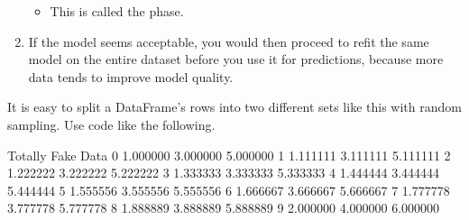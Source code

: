 \documentclass[letterpaper,10pt,english]{sphinxmanual}
\begin{document}
\begin{enumerate}
\begin{itemize}
\item {} 
This is called the  phase.

\end{itemize}

\item {} 
If the model seems acceptable, you would then proceed to re\sphinxhyphen{}fit the same model on the entire dataset  before you use it for predictions, because more data tends to improve model quality.

\end{enumerate}

It is easy to split a DataFrame’s rows into two different sets like this with random sampling.  Use code like the following.

\begin{sphinxVerbatim}[commandchars=\\\{\}]
   
   
           
\end{sphinxVerbatim}

\begin{sphinxVerbatim}[commandchars=\\\{\}]
    Totally      Fake      Data
0  1.000000  3.000000  5.000000
1  1.111111  3.111111  5.111111
2  1.222222  3.222222  5.222222
3  1.333333  3.333333  5.333333
4  1.444444  3.444444  5.444444
5  1.555556  3.555556  5.555556
6  1.666667  3.666667  5.666667
7  1.777778  3.777778  5.777778
8  1.888889  3.888889  5.888889
9  2.000000  4.000000  6.000000
\end{sphinxVerbatim}
\end{document}
